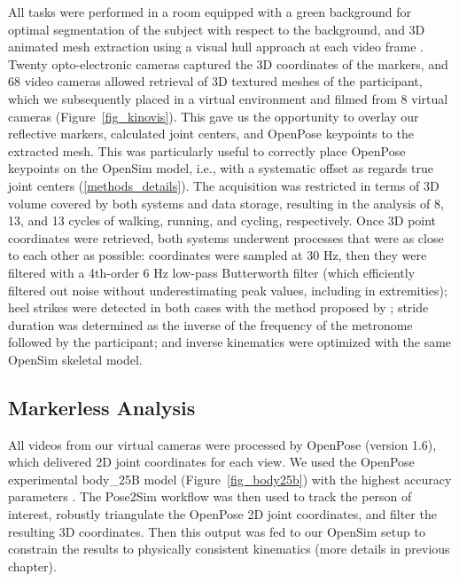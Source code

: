 All tasks were performed in a room equipped with a green background for optimal segmentation of the subject with respect to the background, and 3D animated mesh extraction using a visual hull approach at each video frame \cite{Laurentini1994}. Twenty opto-electronic cameras captured the 3D coordinates of the markers, and 68 video cameras allowed retrieval of 3D textured meshes of the participant, which we subsequently placed in a virtual environment and filmed from 8 virtual cameras (Figure~\ref{fig_kinovis}). This gave us the opportunity to overlay our reflective markers, calculated joint centers, and OpenPose keypoints to the extracted mesh. This was particularly useful to correctly place OpenPose keypoints on the OpenSim model, i.e., with a systematic offset as regards true joint centers (\autoref{methods_details}). The acquisition was restricted in terms of 3D volume covered by both systems and data storage, resulting in the analysis of 8, 13, and 13 cycles of walking, running, and cycling, respectively. Once 3D point coordinates were retrieved, both systems underwent processes that were as close to each other as possible: coordinates were sampled at 30 Hz, then they were filtered with a 4th-order 6 Hz low-pass Butterworth filter (which efficiently filtered out noise without underestimating peak values, including in extremities); heel strikes were detected in both cases with the method proposed by \cite{Zeni2008}; stride duration was determined as the inverse of the frequency of the metronome followed by the participant; and inverse kinematics were optimized with the same OpenSim skeletal model.

\subsection{Markerless Analysis}

All videos from our virtual cameras were processed by OpenPose (version 1.6), which delivered 2D joint coordinates for each view. We used the OpenPose experimental body\_25B model (Figure~\ref{fig_body25b}) with the highest accuracy parameters \cite{Hidalgo2021}. The Pose2Sim workflow was then used to track the person of interest, robustly triangulate the OpenPose 2D joint coordinates, and filter the resulting 3D coordinates. Then this output was fed to our OpenSim setup to constrain the results to physically consistent kinematics (more details in previous chapter). 

